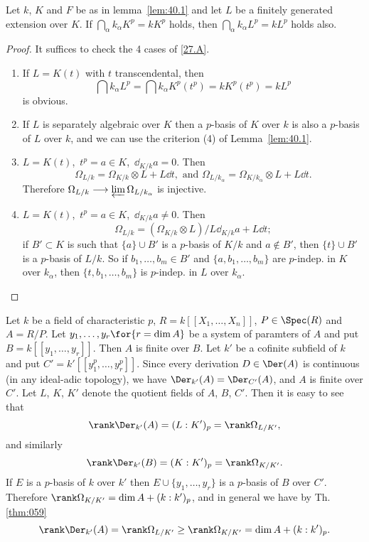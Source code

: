 \documentclass[../main]{subfiles}
\begin{document}
\begin{lemma}
\label{lem:40.2}
Let $k$, $K$ and $F$ be as in lemma~\ref{lem:40.1} and let $L$ be a finitely generated extension over $K$. If $\bigcap\limits_\alpha k_\alpha K^p = k K^p$ holds, then $\bigcap\limits_\alpha k_\alpha L^p = k L^p$ holds also. 
\end{lemma}

\begin{proof}
It suffices to check the 4 cases of \ref{27.A}. 
\begin{enumerate}[label = \roman*)]
    \item If $L = K(t)$ with $t$ transcendental, then \[\bigcap k_\alpha L^p = \bigcap k_\alpha K^p(t^p) = k K^p(t^p) = k L^p\] is obvious. 
    \item If $L$ is separately algebraic over $K$ then a $p$-basis of $K$ over $k$ is also a $p$-basis of $L$ over $k$, and we can use the criterion (4) of Lemma~\ref{lem:40.1}.
    \item $L = K(t)$, $\, t^p = a \in K$, $\, \dd_{K/k} a = 0$. Then \[\Omega_{L/k} = \Omega_{K/k} \otimes L + L \dd t,\text{ and }\Omega_{L/k_\alpha} = \Omega_{K/k_\alpha} \otimes L + L \dd t.\] Therefore $\Omega_{L/k} \longrightarrow \varprojlim \Omega_{L/k_\alpha}$ is injective. 
    \item $L = K(t)$, $\, t^p = a \in K$, $\,\dd_{K/k} a \ne 0$. Then \[\Omega_{L/k} = (\Omega_{K/k} \otimes L)/L \dd_{K/k} a + L \dd t;\] if $B' \subset K$ is such that $\{a\} \cup B'$ is a $p$-basis of $K/k$ and $a \not \in B'$, then $\{t\} \cup B'$ is a $p$-basis of $L/k$. So if $b_1, \ldots, b_m \in B'$ and $\{a, b_1, \ldots, b_m\}$ are $p$-indep. in $K$ over $k_\alpha$, then $\{t, b_1, \ldots, b_m\}$ is $p$-indep. in $L$ over $k_\alpha$. 
\end{enumerate}

\end{proof}

\newparagraph Let $k$ be a field of characteristic $p$, $R = k[[X_1, \ldots, X_n]]$, $P \in \Spec(R)$ and $A = R/P$. Let $y_1, \ldots, y_r\for{r = \dim A}$ be a system of paramters of $A$ and put $B = k[[y_1, \ldots, y_r]]$. Then $A$ is finite over $B$. Let $k'$ be a cofinite subfield of $k$ and put $C' = k'[[y_1^p, \ldots, y_r^p]]$. Since every derivation $D \in \Der(A)$ is continuous (in any ideal-adic topology), we have $\Der_{k'}(A) = \Der_{C'}(A)$, and $A$ is finite over $C'$. Let $L$, $K$, $K'$ denote the quotient fields of $A$, $B$, $C'$. Then it is easy to see that \[\rank \Der_{k'}(A) = (L:K')_p = \rank \Omega_{L/K'},\] and similarly \[\rank \Der_{k'}(B) = (K : K')_p = \rank \Omega_{K/K'}.\] If $E$ is a $p$-basis of $k$ over $k'$ then $E \cup \{y_1, \ldots, y_r\}$ is a $p$-basis of $B$ over $C'$. Therefore $\rank \Omega_{K/K'} = \dim A + (k : k')_p$, and in general we have by Th.\ref{thm:059}
\[
\rank \Der_{k'}(A) = \rank \Omega_{L/K'} \ge \rank \Omega_{K/K'} = \dim A + (k : k')_p.
\]
\end{document}
